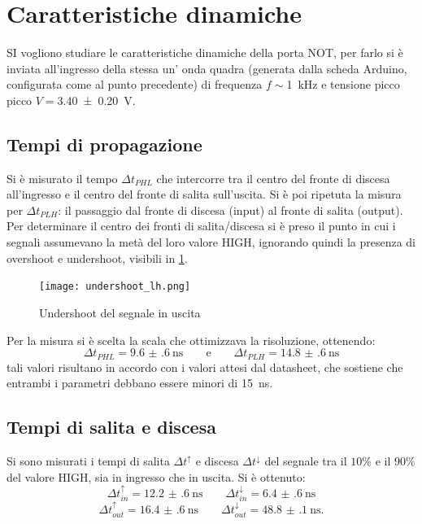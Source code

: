 \section{Caratteristiche dinamiche}
	SI vogliono studiare le caratteristiche dinamiche della porta NOT, per farlo si è inviata all'ingresso della stessa un' onda quadra (generata dalla scheda Arduino, configurata come al punto precedente) di frequenza  $f\sim$\SI{1}{\kilo \hertz} e tensione picco picco $V=$\SI{3.40 \pm 0.20}{\volt}.

	\subsection{Tempi di propagazione}
	Si è misurato il tempo $\Delta t_{PHL}$ che intercorre tra il centro del fronte di discesa all'ingresso e il centro del fronte di salita sull'uscita. Si è poi ripetuta la misura per $\Delta t_{PLH}$: il passaggio dal fronte di discesa (input) al fronte di salita (output).
	Per determinare il centro dei fronti di salita/discesa si è preso il punto in cui i segnali assumevano la metà del loro valore HIGH, ignorando quindi la presenza di overshoot e undershoot, visibili in \figurename{ \ref{f:ripple}}.

	\begin{figure}[H]
		\centering
		\texttt{[image: undershoot\_lh.png]}
		\caption{Undershoot del segnale in uscita}
		\label{f:ripple}
	\end{figure}
	\noindent Per la misura si è scelta la scala che ottimizzava la risoluzione, ottenendo:
	$$\Delta t_{PHL}=\SI{9.6(6)}{\nano \second} \qquad \text{e} \qquad \Delta t_{PLH}=\SI{14.8(6)}{\nano \second}$$
	tali valori risultano in accordo con i valori attesi dal datasheet, che sostiene che entrambi i parametri debbano essere minori di \SI{15}{\nano \second}.
	
\subsection{Tempi di salita e discesa}
Si sono misurati i tempi di salita $\Delta t^{\uparrow}$ e discesa $\Delta t^{\downarrow}$ del segnale tra il $10 \% $ e il $90 \% $ del valore HIGH, sia in ingresso che in uscita. Si è ottenuto:
$$ \Delta t_{in}^{\uparrow}=\SI{12.2(6)}{\nano \second} \qquad \Delta t_{in}^{\downarrow}=\SI{6.4(6)}{\nano \second} $$
$$ \Delta t_{out}^{\uparrow}=\SI{16.4(6)}{\nano \second} \qquad \Delta t_{out}^{\downarrow}=\SI{48.8(1)}{\nano \second}.$$
